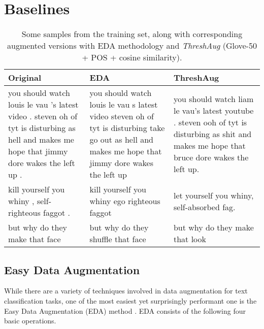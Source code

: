 \documentclass[11pt,a4paper]{article}
\begin{document}
\section{Baselines}
\begin{table*}[t]
    \centering
    \begin{tabular}{p{}p{}p{}}
    \toprule
        \textbf{Original} & \textbf{EDA} & \textbf{ThreshAug}  \\
    \midrule
        you should watch louis le vau 's latest video . steven oh of tyt is disturbing as hell and makes me hope that jimmy dore wakes the left up . & you should watch louis le vau s latest video steven oh of tyt is disturbing take go out as hell and makes me hope that jimmy dore wakes the left up   &
        you should watch liam le vau's latest youtube . steven ooh of tyt is disturbing as shit and makes me hope that bruce dore wakes the left up.

        \\ \midrule
        kill yourself you whiny , self-righteous faggot . & kill yourself you whiny ego righteous faggot &  let yourself you whiny, self-absorbed fag.
\\ \midrule
        but why do they make that face & but why do they shuffle that face & but why do they make that look
 \\
    \bottomrule
    \end{tabular}
    \caption{Some samples from the training set, along with corresponding augmented versions with EDA methodology and \textit{ThreshAug} (Glove-50 + POS + cosine similarity).}
    \label{tab:aug_examples}
\end{table*}

\subsection{Easy Data Augmentation}
While there are a variety of techniques involved in data augmentation for text classification tasks, one of the most easiest yet surprisingly performant one is the Easy Data Augmentation (EDA) method \cite{wei-zou-2019-eda}. EDA consists of the following four basic operations. 
\end{document}
